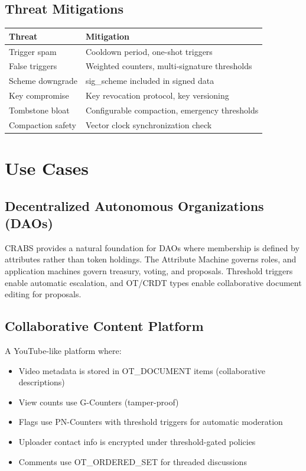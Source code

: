 \documentclass[sigconf,nonacm]{acmart}
\newcommand{\crab}{\textsc{CRABS}}
\begin{document}
\subsection{Threat Mitigations}

\vspace{4pt}
\begin{tabularx}{\columnwidth}{l>{\hsize=0.8\hsize}X}
\toprule
\textbf{Threat} & \textbf{Mitigation} \\
\midrule
Trigger spam & Cooldown period, one-shot triggers \\
False triggers & Weighted counters, multi-signature thresholds \\
Scheme downgrade & sig\_scheme included in signed data \\
Key compromise & Key revocation protocol, key versioning \\
Tombstone bloat & Configurable compaction, emergency thresholds \\
Compaction safety & Vector clock synchronization check \\
\bottomrule
\end{tabularx}

\section{Use Cases}

\subsection{Decentralized Autonomous Organizations (DAOs)}

\crab{} provides a natural foundation for DAOs where membership is defined by attributes rather than token holdings. The Attribute Machine governs roles, and application machines govern treasury, voting, and proposals. Threshold triggers enable automatic escalation, and OT/CRDT types enable collaborative document editing for proposals.

\subsection{Collaborative Content Platform}

A YouTube-like platform where:
\begin{itemize}
    \item Video metadata is stored in OT\_DOCUMENT items (collaborative descriptions)
    \item View counts use G-Counters (tamper-proof)
    \item Flags use PN-Counters with threshold triggers for automatic moderation
    \item Uploader contact info is encrypted under threshold-gated policies
    \item Comments use OT\_ORDERED\_SET for threaded discussions
\end{itemize}
\end{document}
